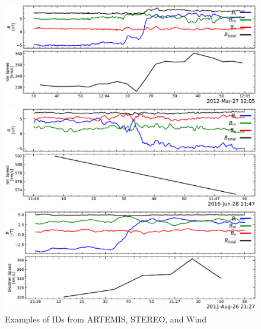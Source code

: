 \documentclass[
]{agujournal2019}
\begin{document}
\begin{figure}

\begin{minipage}{0.33\linewidth}
\includegraphics{figures/examples/artemis_id_example.pdf}\end{minipage}%
%
\begin{minipage}{0.33\linewidth}
\includegraphics{figures/examples/stereo_id_example.pdf}\end{minipage}%
%
\begin{minipage}{0.33\linewidth}
\includegraphics{figures/examples/wind_id_example.pdf}\end{minipage}%

\caption{\label{fig-examples}Examples of IDs from ARTEMIS, STEREO, and Wind}

\end{figure}%
\end{document}
